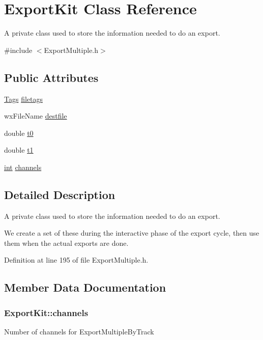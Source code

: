 \hypertarget{class_export_kit}{}\section{Export\+Kit Class Reference}
\label{class_export_kit}


A private class used to store the information needed to do an export.  




{\ttfamily \#include $<$Export\+Multiple.\+h$>$}

\subsection*{Public Attributes}
\begin{DoxyCompactItemize}
\item 
\hyperlink{class_tags}{Tags} \hyperlink{class_export_kit_a3e95396f3a12807aca13b7596a9e760d}{filetags}
\item 
wx\+File\+Name \hyperlink{class_export_kit_a4ab0ccd67ed05eb6b745d2e6b736c68d}{destfile}
\item 
double \hyperlink{class_export_kit_a7b4eb446ba0c07b99f86a703f5411172}{t0}
\item 
double \hyperlink{class_export_kit_a546b007168c1ebb19163a0c1bd74f97c}{t1}
\item 
\hyperlink{xmltok_8h_a5a0d4a5641ce434f1d23533f2b2e6653}{int} \hyperlink{class_export_kit_a6412bbedeca2901f652d5a7c9cb5cf7c}{channels}
\end{DoxyCompactItemize}


\subsection{Detailed Description}
A private class used to store the information needed to do an export. 

We create a set of these during the interactive phase of the export cycle, then use them when the actual exports are done. 

Definition at line 195 of file Export\+Multiple.\+h.



\subsection{Member Data Documentation}
\subsubsection[{\texorpdfstring{channels}{channels}}]{ Export\+Kit\+::channels}\hypertarget{class_export_kit_a6412bbedeca2901f652d5a7c9cb5cf7c}{}\label{class_export_kit_a6412bbedeca2901f652d5a7c9cb5cf7c}
Number of channels for Export\+Multiple\+By\+Track 

